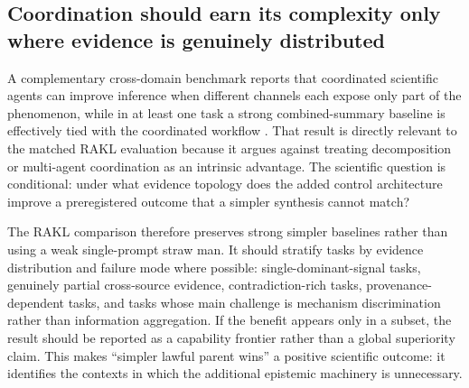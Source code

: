 \subsection{Coordination should earn its complexity only where evidence is genuinely distributed}

A complementary cross-domain benchmark reports that coordinated scientific agents can improve inference when different channels each expose only part of the phenomenon, while in at least one task a strong combined-summary baseline is effectively tied with the coordinated workflow \cite{wong2026coordination}. That result is directly relevant to the matched RAKL evaluation because it argues against treating decomposition or multi-agent coordination as an intrinsic advantage. The scientific question is conditional: under what evidence topology does the added control architecture improve a preregistered outcome that a simpler synthesis cannot match?

The RAKL comparison therefore preserves strong simpler baselines rather than using a weak single-prompt straw man. It should stratify tasks by evidence distribution and failure mode where possible: single-dominant-signal tasks, genuinely partial cross-source evidence, contradiction-rich tasks, provenance-dependent tasks, and tasks whose main challenge is mechanism discrimination rather than information aggregation. If the benefit appears only in a subset, the result should be reported as a capability frontier rather than a global superiority claim. This makes ``simpler lawful parent wins'' a positive scientific outcome: it identifies the contexts in which the additional epistemic machinery is unnecessary.
